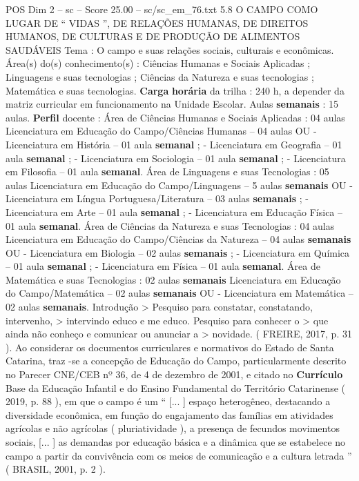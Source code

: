 \begin{textsample}{POS Dim 2 – sc – Score 25.00 – sc/sc\_em\_76.txt}  \label{ex:f2_pos_005}
5.8 O CAMPO COMO LUGAR DE “ VIDAS ”, DE RELAÇÕES HUMANAS, DE DIREITOS HUMANOS, DE CULTURAS E DE PRODUÇÃO DE ALIMENTOS SAUDÁVEIS Tema : O campo e suas relações sociais, culturais e econômicas.
Área(s) do(s) conhecimento(s) : Ciências Humanas e Sociais Aplicadas ; Linguagens e suas tecnologias ; Ciências da Natureza e suas tecnologias ; Matemática e suas tecnologias. \textbf{Carga} \textbf{horária} da trilha : 240 h, a depender da matriz curricular em funcionamento na Unidade Escolar.
Aulas \textbf{semanais} : 15 aulas. \textbf{Perfil} docente : Área de Ciências Humanas e Sociais Aplicadas : 04 aulas Licenciatura em Educação do Campo/Ciências Humanas – 04 aulas OU - Licenciatura em História – 01 aula \textbf{semanal} ; - Licenciatura em Geografia – 01 aula \textbf{semanal} ; - Licenciatura em Sociologia – 01 aula \textbf{semanal} ; - Licenciatura em Filosofia – 01 aula \textbf{semanal}.
Área de Linguagens e suas Tecnologias : 05 aulas Licenciatura em Educação do Campo/Linguagens – 5 aulas \textbf{semanais} OU - Licenciatura em Língua Portuguesa/Literatura – 03 aulas \textbf{semanais} ; - Licenciatura em Arte – 01 aula \textbf{semanal} ; - Licenciatura em Educação Física – 01 aula \textbf{semanal}.
Área de Ciências da Natureza e suas Tecnologias : 04 aulas Licenciatura em Educação do Campo/Ciências da Natureza – 04 aulas \textbf{semanais} OU - Licenciatura em Biologia – 02 aulas \textbf{semanais} ; - Licenciatura em Química – 01 aula \textbf{semanal} ; - Licenciatura em Física – 01 aula \textbf{semanal}.
Área de Matemática e suas Tecnologias : 02 aulas \textbf{semanais} Licenciatura em Educação do Campo/Matemática – 02 aulas \textbf{semanais} OU - Licenciatura em Matemática – 02 aulas \textbf{semanais}.
Introdução > Pesquiso para constatar, constatando, intervenho, > intervindo educo e me educo.
Pesquiso para conhecer o > que ainda não conheço e comunicar ou anunciar a > novidade. ( FREIRE, 2017, p. 31 ).
Ao considerar os documentos curriculares e normativos do Estado de Santa Catarina, traz -se a concepção de Educação do Campo, particularmente descrito no Parecer CNE/CEB nº 36, de 4 de dezembro de 2001, e citado no \textbf{Currículo} Base da Educação Infantil e do Ensino Fundamental do Território Catarinense ( 2019, p. 88 ), em que o campo é um “ [... ] espaço heterogêneo, destacando a diversidade econômica, em função do engajamento das famílias em atividades agrícolas e não agrícolas ( pluriatividade ), a presença de fecundos movimentos sociais, [... ] as demandas por educação básica e a dinâmica que se estabelece no campo a partir da convivência com os meios de comunicação e a cultura letrada ” ( BRASIL, 2001, p. 2 ).

\end{textsample}
